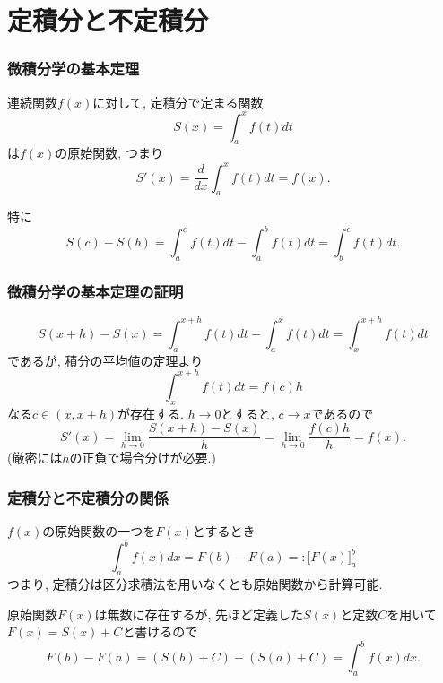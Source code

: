 \section{定積分と不定積分}

\begin{frame}
\frametitle{微積分学の基本定理}


\begin{Thm}[微積分学の基本定理]
連続関数$f(x)$に対して, 定積分で定まる関数
$$
S(x)=\int_a^x f(t)dt
$$
は$f(x)$の原始関数, つまり
$$
S'(x)= \frac{d}{dx} \int_a^x f(t)dt = f(x).
$$
\end{Thm}
特に
$$
S(c)-S(b)= \int_a^c f(t)dt-\int_a^b f(t)dt = \int_b^c f(t)dt. 
$$

\end{frame}



\begin{frame}
\frametitle{微積分学の基本定理の証明}


$$
S(x+h)-S(x)=\int_a^{x+h} f(t)dt - \int_a^{x} f(t)dt = \int_x^{x+h} f(t)dt
$$
であるが, 積分の平均値の定理より
$$
\int_x^{x+h} f(t)dt = f(c)h
$$
なる$c \in (x,x+h)$が存在する. 
$h \to 0$とすると, $c \to x$であるので
$$
S'(x)=\lim_{h \to 0} \frac{S(x+h)-S(x)}{h}=\lim_{h \to 0}\frac{f(c)h}{h}=f(x).
$$
(厳密には$h$の正負で場合分けが必要.)

\end{frame}



\begin{frame}
\frametitle{定積分と不定積分の関係}

\begin{Thm}
$f(x)$の原始関数の一つを$F(x)$とするとき
$$
\int_a^b f(x)dx=F(b)-F(a)=:\big[F(x)\big]_a^b
$$
つまり, 定積分は区分求積法を用いなくとも原始関数から計算可能.  
\end{Thm}
原始関数$F(x)$は無数に存在するが, 先ほど定義した$S(x)$と定数$C$を用いて$F(x)=S(x)+C$と書けるので
$$
F(b)-F(a)=(S(b)+C)-(S(a)+C)=\int_a^bf(x)dx. 
$$

\end{frame}



